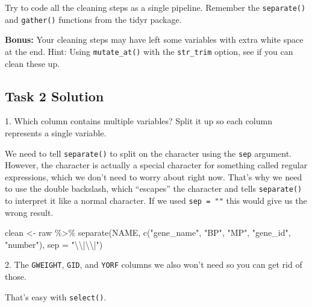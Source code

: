 \documentclass[
]{book}
\newenvironment{Shaded}{\begin{snugshade}}{\end{snugshade}}
\newcommand{\AttributeTok}[1]{\textcolor[rgb]{0.77,0.63,0.00}{#1}}
\newcommand{\FunctionTok}[1]{\textcolor[rgb]{0.00,0.00,0.00}{#1}}
\newcommand{\NormalTok}[1]{#1}
\newcommand{\OtherTok}[1]{\textcolor[rgb]{0.56,0.35,0.01}{#1}}
\newcommand{\SpecialCharTok}[1]{\textcolor[rgb]{0.00,0.00,0.00}{#1}}
\newcommand{\StringTok}[1]{\textcolor[rgb]{0.31,0.60,0.02}{#1}}
\begin{document}
Try to code all the cleaning steps as a single pipeline. Remember the \texttt{separate()} and \texttt{gather()} functions from the tidyr package.

\textbf{Bonus:} Your cleaning steps may have left some variables with extra white space at the end. Hint: Using \texttt{mutate\_at()} with the \texttt{str\_trim} option, see if you can clean these up.

\hypertarget{task-2-solution}{%
\subsection*{Task 2 Solution}\label{task-2-solution}}

1. Which column contains multiple variables? Split it up so each column represents a single variable.

We need to tell \texttt{separate()} to split on the \texttt{\textbar{}\textbar{}} character using the \texttt{sep} argument. However, the \texttt{\textbar{}} character is actually a special character for something called regular expressions, which we don't need to worry about right now. That's why we need to use the double backslash, which ``escapes'' the \texttt{\textbar{}} character and tells \texttt{separate()} to interpret it like a normal character. If we used \texttt{sep\ =\ "\textbar{}\textbar{}"} this would give us the wrong result.

\begin{Shaded}
\begin{Highlighting}[]
\NormalTok{clean }\OtherTok{\textless{}{-}}\NormalTok{ raw }\SpecialCharTok{\%\textgreater{}\%}
  \FunctionTok{separate}\NormalTok{(NAME, }\FunctionTok{c}\NormalTok{(}\StringTok{"gene\_name"}\NormalTok{, }\StringTok{"BP"}\NormalTok{, }\StringTok{"MP"}\NormalTok{, }\StringTok{"gene\_id"}\NormalTok{, }\StringTok{"number"}\NormalTok{), }\AttributeTok{sep =} \StringTok{"}\SpecialCharTok{\textbackslash{}\textbackslash{}}\StringTok{|}\SpecialCharTok{\textbackslash{}\textbackslash{}}\StringTok{|"}\NormalTok{)}
\end{Highlighting}
\end{Shaded}

2. The \texttt{GWEIGHT}, \texttt{GID}, and \texttt{YORF} columns we also won't need so you can get rid of those.

That's easy with \texttt{select()}.
\end{document}
